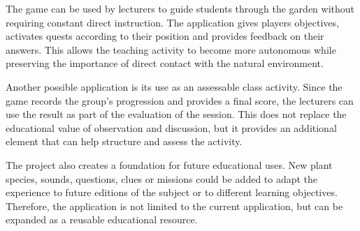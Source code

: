 The game can be used by lecturers to guide students through the garden without requiring constant direct instruction. The application gives players objectives, activates quests according to their position and provides feedback on their answers. This allows the teaching activity to become more autonomous while preserving the importance of direct contact with the natural environment.

Another possible application is its use as an assessable class activity. Since the game records the group’s progression and provides a final score, the lecturers can use the result as part of the evaluation of the session. This does not replace the educational value of observation and discussion, but it provides an additional element that can help structure and assess the activity.

The project also creates a foundation for future educational uses. New plant species, sounds, questions, clues or missions could be added to adapt the experience to future editions of the subject or to different learning objectives. Therefore, the application is not limited to the current application, but can be expanded as a reusable educational resource.











